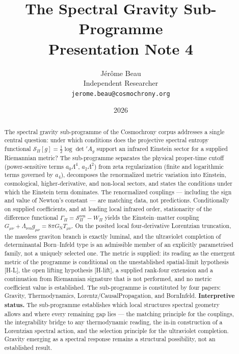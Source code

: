 \documentclass[11pt,a4paper]{article}
\title{The Spectral Gravity Sub-Programme\\[0.4em]
\large Presentation Note 4}
\author{J\'{e}r\^{o}me Beau\\[0.3em]
\small Independent Researcher\\
\small \texttt{jerome.beau@cosmochrony.org}}
\date{2026}
\theoremstyle{definition}
\newcommand{\SPI}{\mathcal{S}_\Pi}
\newcommand{\GN}{G_{\mathrm{N}}}
\begin{document}
  \maketitle

  \begin{abstract}
    The spectral gravity sub-programme of the Cosmochrony corpus addresses a single
    central question: under which conditions does the projective spectral entropy functional
    $\SPI[g] = \tfrac{1}{2}\log\det' A_g$ support an infrared Einstein sector for a supplied
    Riemannian metric?
    The sub-programme separates the physical proper-time cutoff (power-sensitive terms
    $a_0\Lambda^4$, $a_2\Lambda^2$) from zeta regularization (finite and logarithmic terms
    governed by $a_4$), decomposes the renormalized metric variation into Einstein,
    cosmological, higher-derivative, and non-local sectors, and states the conditions
    under which the Einstein term dominates.
    The renormalized couplings --- including the sign and value of Newton's constant --- are
    matching data, not predictions.
    Conditionally on supplied coefficients, and at leading local infrared order, stationarity of the difference
    functional $\Gamma_\Pi = \SPI^{\mathrm{ren}} - W_\Pi$ yields the Einstein--matter coupling
    $G_{\mu\nu} + \Lambda_{\mathrm{ren}} g_{\mu\nu} = 8\pi\GN T_{\mu\nu}$.
    On the posited local four-derivative Lorentzian truncation, the massless graviton branch is
    exactly luminal, and the ultraviolet completion of determinantal Born--Infeld type is an
    admissible member of an explicitly parametrised family, not a uniquely selected one.
    The metric is supplied: its reading as the emergent metric of the programme is conditional on the
    unestablished spatial-limit hypothesis [H-L], the open lifting hypothesis [H-lift], a supplied rank-four
    extension and a continuation from Riemannian signature that is not performed, and no metric coefficient value is
    established.
    The sub-programme is constituted by four papers: Gravity, Thermodynamics,
    Lorentz/CausalPropagation, and BornInfeld.
    \textbf{Interpretive status.}
    The sub-programme establishes which local structures spectral geometry allows and where
    every remaining gap lies --- the matching principle for the couplings, the integrability
    bridge to any thermodynamic reading, the in-in construction of a Lorentzian spectral
    action, and the selection principle for the ultraviolet completion.
    Gravity emerging as a spectral response remains a structural possibility, not an
    established result.
  \end{abstract}
\end{document}
